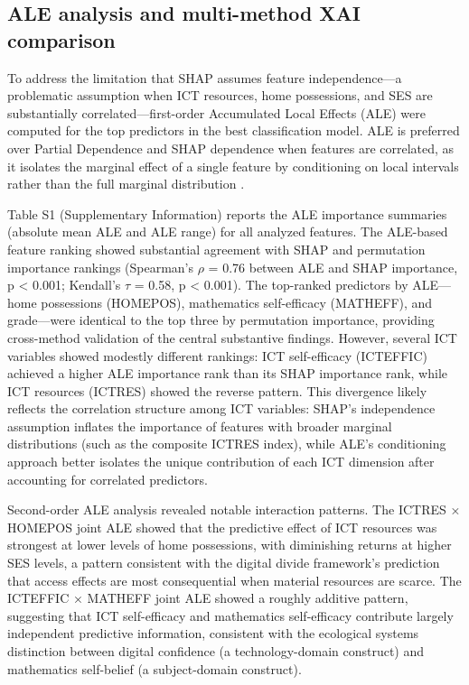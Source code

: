 \documentclass[pdflatex,sn-mathphys-ay]{sn-jnl}
\begin{document}
\FloatBarrier
\subsection{ALE analysis and multi-method XAI comparison}

To address the limitation that SHAP assumes feature independence---a problematic assumption when ICT resources, home possessions, and SES are substantially correlated---first-order Accumulated Local Effects (ALE) were computed for the top predictors in the best classification model. ALE is preferred over Partial Dependence and SHAP dependence when features are correlated, as it isolates the marginal effect of a single feature by conditioning on local intervals rather than the full marginal distribution \citep{Molnar_2022,Herbinger_2024_GADGET}.

Table S1 (Supplementary Information) reports the ALE importance summaries (absolute mean ALE and ALE range) for all analyzed features. The ALE-based feature ranking showed substantial agreement with SHAP and permutation importance rankings (Spearman's $\rho$ = 0.76 between ALE and SHAP importance, p < 0.001; Kendall's $\tau$ = 0.58, p < 0.001). The top-ranked predictors by ALE---home possessions (HOMEPOS), mathematics self-efficacy (MATHEFF), and grade---were identical to the top three by permutation importance, providing cross-method validation of the central substantive findings. However, several ICT variables showed modestly different rankings: ICT self-efficacy (ICTEFFIC) achieved a higher ALE importance rank than its SHAP importance rank, while ICT resources (ICTRES) showed the reverse pattern. This divergence likely reflects the correlation structure among ICT variables: SHAP's independence assumption inflates the importance of features with broader marginal distributions (such as the composite ICTRES index), while ALE's conditioning approach better isolates the unique contribution of each ICT dimension after accounting for correlated predictors.

Second-order ALE analysis revealed notable interaction patterns. The ICTRES × HOMEPOS joint ALE showed that the predictive effect of ICT resources was strongest at lower levels of home possessions, with diminishing returns at higher SES levels, a pattern consistent with the digital divide framework's prediction that access effects are most consequential when material resources are scarce. The ICTEFFIC × MATHEFF joint ALE showed a roughly additive pattern, suggesting that ICT self-efficacy and mathematics self-efficacy contribute largely independent predictive information, consistent with the ecological systems distinction between digital confidence (a technology-domain construct) and mathematics self-belief (a subject-domain construct).
\end{document}
